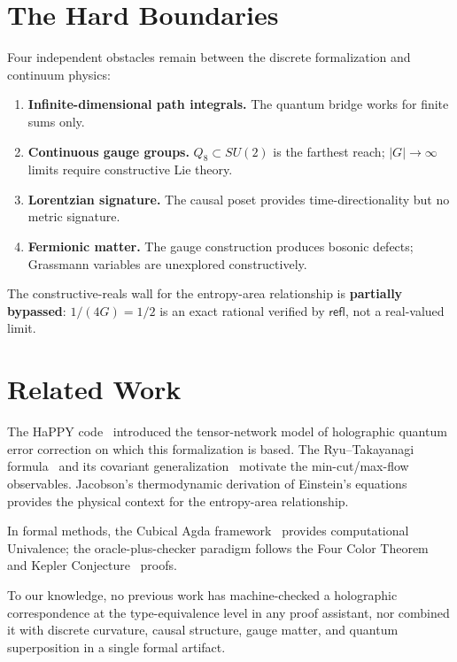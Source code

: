 \documentclass[11pt,a4paper]{article}
\newcommand{\refl}{\mathsf{refl}}
\begin{document}
\section{The Hard Boundaries}
\label{sec:walls}

Four independent obstacles remain between the discrete formalization
and continuum physics:

\begin{enumerate}[nosep]
\item \textbf{Infinite-dimensional path integrals.}  The quantum
  bridge works for finite sums only.
\item \textbf{Continuous gauge groups.}  $Q_8 \subset SU(2)$ is
  the farthest reach; $|G| \to \infty$ limits require constructive
  Lie theory.
\item \textbf{Lorentzian signature.}  The causal poset provides
  time-directionality but no metric signature.
\item \textbf{Fermionic matter.}  The gauge construction produces
  bosonic defects; Grassmann variables are unexplored constructively.
\end{enumerate}

The constructive-reals wall for the entropy-area relationship is
\textbf{partially bypassed}: $1/(4G) = 1/2$ is an exact rational
verified by $\refl$, not a real-valued limit.

\section{Related Work}
\label{sec:related}

The HaPPY code~\cite{Pastawski2015} introduced the tensor-network
model of holographic quantum error correction on which this
formalization is based.  The Ryu--Takayanagi
formula~\cite{Ryu2006} and its covariant
generalization~\cite{Wall2012} motivate the min-cut/max-flow
observables.  Jacobson's thermodynamic derivation of Einstein's
equations~\cite{Jacobson1995} provides the physical context for
the entropy-area relationship.

In formal methods, the Cubical Agda
framework~\cite{VezzosiMortbergAbel2021} provides computational
Univalence; the oracle-plus-checker paradigm follows the Four Color
Theorem~\cite{Gonthier2005} and Kepler
Conjecture~\cite{Hales2017} proofs.

To our knowledge, no previous work has machine-checked a
holographic correspondence at the type-equivalence level in any
proof assistant, nor combined it with discrete curvature, causal
structure, gauge matter, and quantum superposition in a single
formal artifact.
\end{document}
